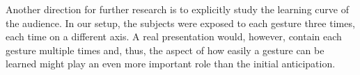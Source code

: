 \documentclass{sigchi}
\begin{document}
Another direction for further research is to explicitly study the learning curve of the audience. In our setup, the subjects were exposed to each gesture three times, each time on a different axis. A real presentation would, however, contain each gesture multiple times and, thus, the aspect of how easily a gesture can be learned might play an even more important role than the initial anticipation. 


%
%
%
%
%
\end{document}
